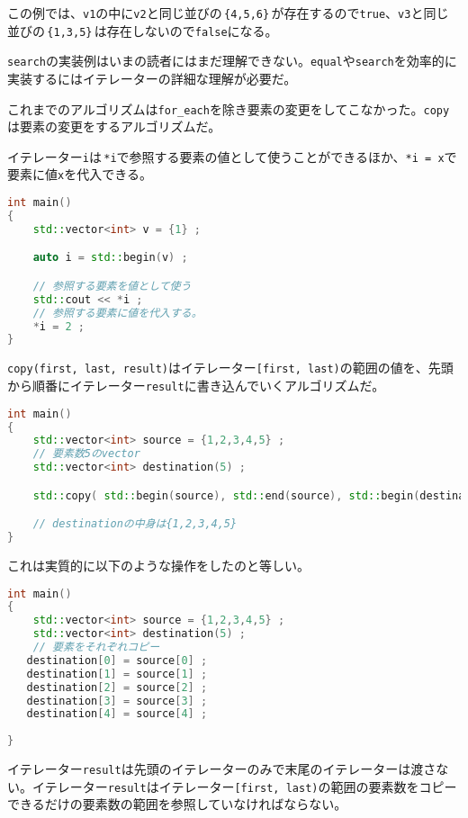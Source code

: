 この例では、\texttt{v1}の中に\texttt{v2}と同じ並びの\,\texttt{\{4,5,6\}}\,が存在するので\texttt{true}、\texttt{v3}と同じ並びの\,\texttt{\{1,3,5\}}\,は存在しないので\texttt{false}になる。

\texttt{search}の実装例はいまの読者にはまだ理解できない。\texttt{equal}や\texttt{search}を効率的に実装するにはイテレーターの詳細な理解が必要だ。


これまでのアルゴリズムは\texttt{for\_each}を除き要素の変更をしてこなかった。\texttt{copy}は要素の変更をするアルゴリズムだ。

イテレーター\texttt{i}は\,\texttt{*i}で参照する要素の値として使うことができるほか、\texttt{*i = x}で要素に値\texttt{x}を代入できる。

\begin{lstlisting}[language={C++}]
int main()
{
    std::vector<int> v = {1} ;

    auto i = std::begin(v) ;

    // 参照する要素を値として使う
    std::cout << *i ;
    // 参照する要素に値を代入する。
    *i = 2 ;
}
\end{lstlisting}

\texttt{copy(first, last, result)}はイテレーター\texttt{[first, last)}の範囲の値を、先頭から順番にイテレーター\texttt{result}に書き込んでいくアルゴリズムだ。

\ifTombow\pagebreak\fi
\begin{lstlisting}[language={C++}]
int main()
{
    std::vector<int> source = {1,2,3,4,5} ;
    // 要素数5のvector
    std::vector<int> destination(5) ;

    std::copy( std::begin(source), std::end(source), std::begin(destination) ) ;

    // destinationの中身は{1,2,3,4,5}
}
\end{lstlisting}

これは実質的に以下のような操作をしたのと等しい。

\begin{lstlisting}[language={C++}]
int main()
{
    std::vector<int> source = {1,2,3,4,5} ;
    std::vector<int> destination(5) ;
    // 要素をそれぞれコピー 
   destination[0] = source[0] ;
   destination[1] = source[1] ;
   destination[2] = source[2] ;
   destination[3] = source[3] ;
   destination[4] = source[4] ;
   
}
\end{lstlisting}

イテレーター\texttt{result}は先頭のイテレーターのみで末尾のイテレーターは渡さない。イテレーター\texttt{result}はイテレーター\texttt{[first, last)}の範囲の要素数をコピーできるだけの要素数の範囲を参照していなければならない。

